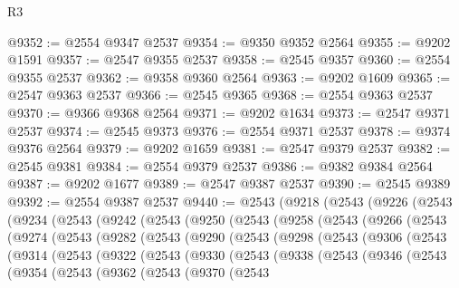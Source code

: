 \begin{lexlean}{R3}
\begin{coremodule}
@9352 := @2554 @9347 @2537
@9354 := @9350 @9352 @2564
@9355 := @9202 @1591
@9357 := @2547 @9355 @2537
@9358 := @2545 @9357
@9360 := @2554 @9355 @2537
@9362 := @9358 @9360 @2564
@9363 := @9202 @1609
@9365 := @2547 @9363 @2537
@9366 := @2545 @9365
@9368 := @2554 @9363 @2537
@9370 := @9366 @9368 @2564
@9371 := @9202 @1634
@9373 := @2547 @9371 @2537
@9374 := @2545 @9373
@9376 := @2554 @9371 @2537
@9378 := @9374 @9376 @2564
@9379 := @9202 @1659
@9381 := @2547 @9379 @2537
@9382 := @2545 @9381
@9384 := @2554 @9379 @2537
@9386 := @9382 @9384 @2564
@9387 := @9202 @1677
@9389 := @2547 @9387 @2537
@9390 := @2545 @9389
@9392 := @2554 @9387 @2537
@9440 := @2543
    (@9218
      (@2543
        (@9226
          (@2543
            (@9234
              (@2543
                (@9242
                  (@2543
                    (@9250
                      (@2543
                        (@9258
                          (@2543
                            (@9266
                              (@2543
                                (@9274
                                  (@2543
                                    (@9282
                                      (@2543
                                        (@9290
                                          (@2543
                                            (@9298
                                              (@2543
                                                (@9306
                                                  (@2543
                                                    (@9314
                                                      (@2543
                                                        (@9322
                                                          (@2543
                                                            (@9330
                                                              (@2543
                                                                (@9338
                                                                  (@2543
                                                                    (@9346
                                                                      (@2543
                                                                        (@9354
                                                                          (@2543
                                                                            (@9362
                                                                              (@2543
                                                                                (@9370
                                                                                  (@2543

\end{coremodule}
\end{lexlean}
